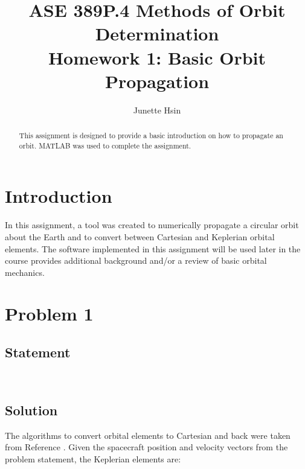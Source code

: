 \documentclass[conf]{new-aiaa}
\title{ASE 389P.4 Methods of Orbit Determination \\ Homework 1: Basic Orbit Propagation}
\author{Junette Hsin}
\affil{Masters Student, Aerospace Engineering and Engineering Mechanics, University of Texas, Austin, TX 78712}
\begin{document}
\maketitle

\begin{abstract}
This assignment is designed to provide a basic introduction on how to propagate an orbit. MATLAB was used to complete the assignment. 
\end{abstract}


\section{Introduction}

In this assignment, a tool was created to numerically propagate a circular orbit about the Earth and to convert between Cartesian and Keplerian orbital elements. The software implemented in this assignment will be used later in the course provides additional background and/or a review of basic orbital mechanics.



\section{Problem 1}

\subsection{Statement} 
\begin{center}
 \\
\end{center}

\subsection{Solution} 

The algorithms to convert orbital elements to Cartesian and back were taken from Reference \cite{bate_astrodynamics}. Given the spacecraft position and velocity vectors from the problem statement, the Keplerian elements are: 
\end{document}
